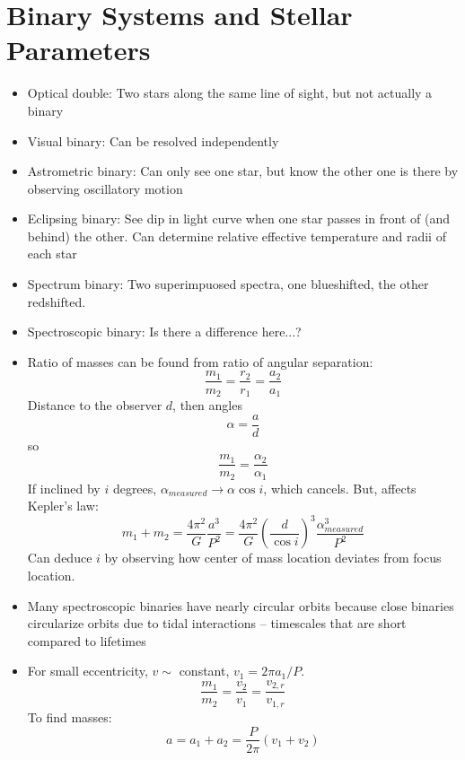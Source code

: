 \documentclass[12pt]{article}
\begin{document}
\section{Binary Systems and Stellar Parameters}
\begin{itemize}
\item Optical double: Two stars along the same line of sight, but not actually a binary
\item Visual binary: Can be resolved independently
\item Astrometric binary: Can only see one star, but know the other one is there by observing oscillatory motion
\item Eclipsing binary: See dip in light curve when one star passes in front of (and behind) the other. Can determine relative effective temperature and radii of each star
\item Spectrum binary: Two superimpuosed spectra, one blueshifted, the other redshifted.
\item Spectroscopic binary: Is there a difference here...?
\item Ratio of masses can be found from ratio of angular separation:
\begin{equation}
\frac{m_1}{m_2} = \frac{r_2}{r_1} = \frac{a_2}{a_1}
\end{equation}
Distance to the observer $d$, then angles
\begin{equation}
\alpha = \frac{a}{d}
\end{equation}
so 
\begin{equation}
\frac{m_1}{m_2} = \frac{\alpha_2}{\alpha_1}
\end{equation}
If inclined by $i$ degrees, $\alpha_{measured}\rightarrow \alpha \cos i$, which cancels. But, affects Kepler's law:
\begin{equation}
m_1 + m_2 = \frac{4\pi^2}{G}\frac{a^3}{P^2} = \frac{4\pi^2}{G}\left(\frac{d}{\cos i}\right)^3\frac{\alpha_{measured}^3}{P^2}
\end{equation}
Can deduce $i$ by observing how center of mass location deviates from focus location.
\item Many spectroscopic binaries have nearly circular orbits because close binaries circularize orbits due to tidal interactions -- timescales that are short compared to lifetimes
\item For small eccentricity, $v \sim$ constant, $v_1 = 2\pi a_1/P$.
\begin{equation}
\frac{m_1}{m_2} = \frac{v_2}{v_1} = \frac{v_{2,r}}{v_{1,r}}
\end{equation}
To find masses:
\begin{equation}
a = a_1+ a_2 = \frac{P}{2\pi}(v_1 + v_2)
\end{equation}
\end{itemize}
\end{document}
